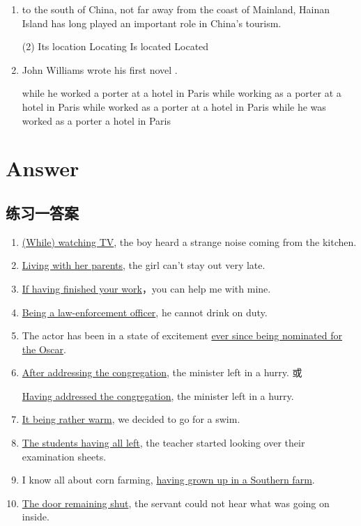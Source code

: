 \begin{enumerate}
\item \ttu to the south of China, not far away from the coast of Mainland, Hainan Island has long played an important role in China's tourism.
\begin{tasks}(2)
  \task Its location
  \task Locating
  \task Is located
  \task Located
\end{tasks}

\item John Williams wrote his first novel \ttu.
\begin{tasks}
  \task while he worked a porter at a hotel in Paris
  \task while working as a porter at a hotel in Paris
  \task while worked as a porter at a hotel in Paris
  \task while he was worked as a porter a hotel in Paris
\end{tasks}

\end{enumerate}

\section{Answer}

\subsection{练习一答案}
\begin{enumerate}
\item \ul{(While) watching TV}, the boy heard a strange noise coming from the
  kitchen.

\item \ul{Living with her parents}, the girl can't stay out very late.

\item \ul{If having finished your work}，you can help me with mine.

\item \ul{Being a law-enforcement officer}, he cannot drink on duty.

\item The actor has been in a state of excitement \ul{ever since being
    nominated for the Oscar}.

\item \ul{After addressing the congregation}, the minister left in a hurry. 或

  \ul{Having addressed the congregation}, the minister left in a hurry.
\item \ul{It being rather warm}, we decided to go for a swim.

\item \ul{The students having all left}, the teacher started looking over their
  examination sheets.

\item I know all about corn farming, \ul{having grown up in a Southern farm}.

\item \ul{The door remaining shut}, the servant could not hear what was going on
  inside.

\end{enumerate}

